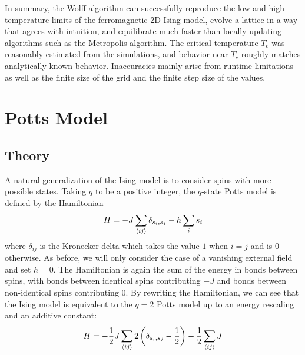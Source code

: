 \documentclass[twocolumn,aps,prl]{revtex4-1} %
\begin{document}
%
%
In summary, the Wolff algorithm can successfully reproduce the low and high temperature limits of the ferromagnetic 2D Ising model, evolve a lattice in a way that agrees with intuition, and equilibrate much faster than locally updating algorithms such as the Metropolis algorithm. The critical temperature $T_c$ was reasonably estimated from the simulations, and behavior near $T_c$ roughly matches analytically known behavior. Inaccuracies mainly arise from runtime limitations as well as the finite size of the grid and the finite step size of the values.





\section{Potts Model}
\subsection{Theory}
A natural generalization of the Ising model is to consider spins with more possible states. Taking $q$ to be a positive integer, the $q$-state Potts model is defined by the Hamiltonian
\begin{equation}
	H = -J\sum_{\braket{ij}}\delta_{s_i,s_j} - h\sum_{i}s_i
\end{equation}
where $\delta_{ij}$ is the Kronecker delta which takes the value $1$ when $i = j$ and is 0 otherwise. As before, we will only consider the case of a vanishing external field and set $h = 0$. The Hamiltonian is again the sum of the energy in bonds between spins, with bonds between identical spins contributing $-J$ and bonds between non-identical spins contributing 0. By rewriting the Hamiltonian, we can see that the Ising model is equivalent to the $q = 2$ Potts model up to an energy rescaling and an additive constant:
\begin{equation}
	H = -\frac{1}{2}J\sum_{\braket{ij}}2\left(\delta_{s_i,s_j} - \frac{1}{2}\right) - \frac{1}{2}\sum_{\braket{ij}}J
\end{equation}
\end{document}
